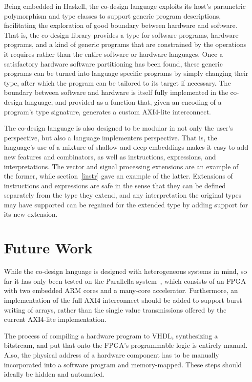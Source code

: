 \documentclass[../paper.tex]{subfiles}
\begin{document}
Being embedded in Haskell, the co-design language exploits its host's parametric polymorphism and type classes to support generic program descriptions, facilitating the exploration of good boundary between hardware and software. That is, the co-design library provides a type for software programs, hardware programs, and a kind of generic programs that are constrained by the operations it requires rather than the entire software or hardware languages. Once a satisfactory hardware software partitioning has been found, these generic programs can be turned into language specific programs by simply changing their type, after which the program can be tailored to its target if necessary. The boundary between software and hardware is itself fully implemented in the co-design language, and provided as a function that, given an encoding of a program's type signature, generates a custom AXI4-lite interconnect.

The co-design language is also designed to be modular in not only the user's perspective, but also a language implementers perspective. That is, the language's use of a mixture of shallow and deep embeddings makes it easy to add new features and combinators, as well as instructions, expressions, and interpretations. The vector and signal processing extensions are an example of the former, while section~\ref{instr} gave an example of the latter. Extensions of instructions and expressions are safe in the sense that they can be defined separately from the type they extend, and any interpretation the original types may have supported can be regained for the extended type by adding support for its new extension.

\section{Future Work}
\label{future}

While the co-design language is designed with heterogeneous systems in mind, so far it has only been tested on the Parallella system~\cite{olofsson2014}, which consists of an FPGA with two embedded ARM cores and a many-core accelerator. Furthermore, an implementation of the full AXI4 interconnect should be added to support burst writing of arrays, rather than the single value transmissions offered by the current AXI4-lite implementation.

The process of compiling a hardware program to VHDL, synthesizing a bitstream, and put that onto the FPGA's programmable logic is entirely manual. Also, the physical address of a hardware component has to be manually incorporated into a software program and memory-mapped. These steps should ideally be hidden and automated.
\end{document}
